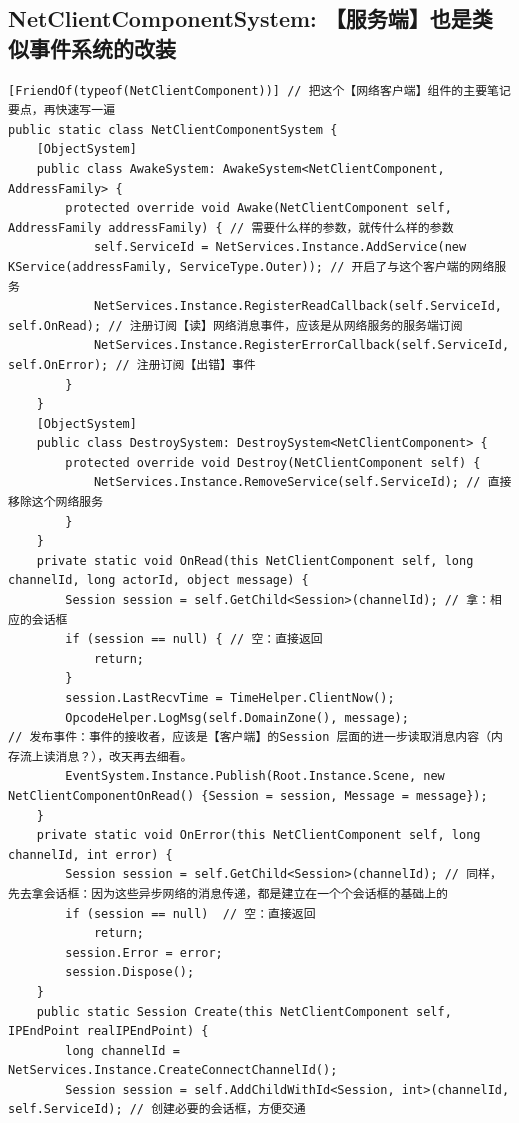 \documentclass[9pt, b5paper]{article}
\begin{document}
\subsection{NetClientComponentSystem: 【服务端】也是类似事件系统的改装}
\label{sec-8-6}
\begin{verbatim}
[FriendOf(typeof(NetClientComponent))] // 把这个【网络客户端】组件的主要笔记要点，再快速写一遍
public static class NetClientComponentSystem {
    [ObjectSystem]
    public class AwakeSystem: AwakeSystem<NetClientComponent, AddressFamily> {
        protected override void Awake(NetClientComponent self, AddressFamily addressFamily) { // 需要什么样的参数，就传什么样的参数
            self.ServiceId = NetServices.Instance.AddService(new KService(addressFamily, ServiceType.Outer)); // 开启了与这个客户端的网络服务
            NetServices.Instance.RegisterReadCallback(self.ServiceId, self.OnRead); // 注册订阅【读】网络消息事件，应该是从网络服务的服务端订阅
            NetServices.Instance.RegisterErrorCallback(self.ServiceId, self.OnError); // 注册订阅【出错】事件
        }
    }
    [ObjectSystem]
    public class DestroySystem: DestroySystem<NetClientComponent> {
        protected override void Destroy(NetClientComponent self) {
            NetServices.Instance.RemoveService(self.ServiceId); // 直接移除这个网络服务
        }
    }
    private static void OnRead(this NetClientComponent self, long channelId, long actorId, object message) {
        Session session = self.GetChild<Session>(channelId); // 拿：相应的会话框
        if (session == null) { // 空：直接返回
            return;
        }
        session.LastRecvTime = TimeHelper.ClientNow();
        OpcodeHelper.LogMsg(self.DomainZone(), message);
// 发布事件：事件的接收者，应该是【客户端】的Session 层面的进一步读取消息内容（内存流上读消息？），改天再去细看。
        EventSystem.Instance.Publish(Root.Instance.Scene, new NetClientComponentOnRead() {Session = session, Message = message}); 
    }
    private static void OnError(this NetClientComponent self, long channelId, int error) {
        Session session = self.GetChild<Session>(channelId); // 同样，先去拿会话框：因为这些异步网络的消息传递，都是建立在一个个会话框的基础上的
        if (session == null)  // 空：直接返回 
            return;
        session.Error = error;
        session.Dispose();
    }
    public static Session Create(this NetClientComponent self, IPEndPoint realIPEndPoint) {
        long channelId = NetServices.Instance.CreateConnectChannelId();
        Session session = self.AddChildWithId<Session, int>(channelId, self.ServiceId); // 创建必要的会话框，方便交通

\end{verbatim}
\end{document}
